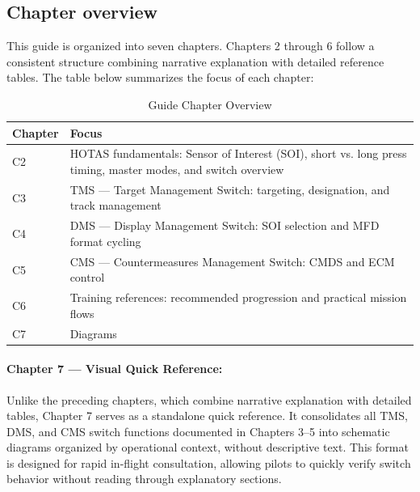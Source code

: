 \documentclass[11pt, a4paper, twoside]{report}
\begin{document}
\subsection{Chapter overview}
\label{sec:C1-S3-S1}

This guide is organized into seven chapters. Chapters 2 through 6 follow a consistent structure combining narrative explanation with detailed reference tables. The table below summarizes the focus of each chapter:

\begin{table}[H]
	\centering
	\caption{Guide Chapter Overview}
	\label{tab:C1-chapter-overview}
	\small
	\renewcommand{\arraystretch}{1.25}
	\begin{tabular}{C{1.5cm} L{12.0cm}}
		\toprule
		\textbf{Chapter} & \textbf{Focus} \\
		\midrule
		C2 & HOTAS fundamentals: Sensor of Interest (SOI), short vs. long press timing, master modes, and switch overview \\
		C3 & TMS --- Target Management Switch: targeting, designation, and track management \\
		C4 & DMS --- Display Management Switch: SOI selection and MFD format cycling \\
		C5 & CMS --- Countermeasures Management Switch: CMDS and ECM control \\
		C6 & Training references: recommended progression and practical mission flows \\
		C7 & Diagrams \\
		\bottomrule
	\end{tabular}
\end{table}

\paragraph{Chapter 7 --- Visual Quick Reference:}
Unlike the preceding chapters, which combine narrative explanation with detailed tables, Chapter 7 serves as a standalone quick reference. It consolidates all TMS, DMS, and CMS switch functions documented in Chapters 3--5 into schematic diagrams organized by operational context, without descriptive text. This format is designed for rapid in-flight consultation, allowing pilots to quickly verify switch behavior without reading through explanatory sections.

\end{document}
